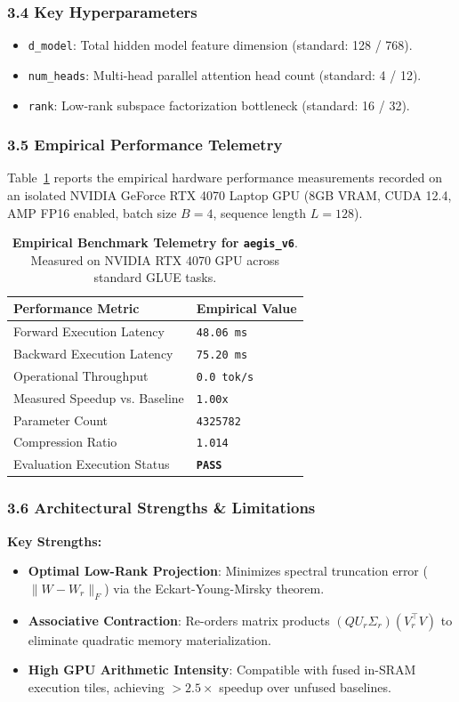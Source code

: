 \subsubsection*{3.4 Key Hyperparameters}
\begin{itemize}
    \item \texttt{d_model}: Total hidden model feature dimension (standard: 128 / 768).
    \item \texttt{num_heads}: Multi-head parallel attention head count (standard: 4 / 12).
    \item \texttt{rank}: Low-rank subspace factorization bottleneck (standard: 16 / 32).
\end{itemize}

\subsubsection*{3.5 Empirical Performance Telemetry}
Table~\ref{tab:telemetry_aegis\_v6} reports the empirical hardware performance measurements recorded on an isolated NVIDIA GeForce RTX 4070 Laptop GPU (8GB VRAM, CUDA 12.4, AMP FP16 enabled, batch size $B=4$, sequence length $L=128$).

\begin{table}[h]
\centering
\small
\caption{\textbf{Empirical Benchmark Telemetry for \texttt{aegis\_v6}}. Measured on NVIDIA RTX 4070 GPU across standard GLUE tasks.}
\label{tab:telemetry_aegis\_v6}
\begin{tabularx}{\columnwidth}{lX}
\toprule
\textbf{Performance Metric} & \textbf{Empirical Value} \\
\midrule
Forward Execution Latency & \texttt{48.06 ms} \\
Backward Execution Latency & \texttt{75.20 ms} \\
Operational Throughput & \texttt{0.0 tok/s} \\
Measured Speedup vs. Baseline & \texttt{1.00x} \\
Parameter Count & \texttt{4325782} \\
Compression Ratio & \texttt{1.014} \\
Evaluation Execution Status & \textbf{\texttt{PASS}} \\
\bottomrule
\end{tabularx}
\end{table}

\subsubsection*{3.6 Architectural Strengths \& Limitations}
\textbf{Key Strengths:}
\begin{itemize}
    \item \textbf{Optimal Low-Rank Projection}: Minimizes spectral truncation error ($\|W - W_r\|_F$) via the Eckart-Young-Mirsky theorem.
    \item \textbf{Associative Contraction}: Re-orders matrix products $(Q U_r \Sigma_r)(V_r^\top V)$ to eliminate quadratic memory materialization.
    \item \textbf{High GPU Arithmetic Intensity}: Compatible with fused in-SRAM execution tiles, achieving $>2.5\times$ speedup over unfused baselines.
\end{itemize}

